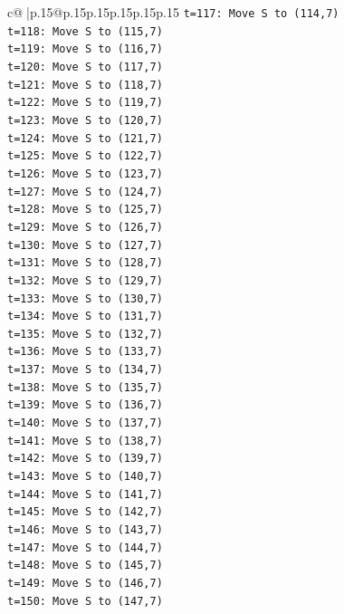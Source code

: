 \documentclass{article}
\begin{document}
{\begin{supertabular}{c@{$\;$}|p{.15\linewidth}@{}p{.15\linewidth}p{.15\linewidth}p{.15\linewidth}p{.15\linewidth}p{.15\linewidth}}
{{{\texttt{t=117: Move S to (114,7)} \\
\texttt{t=118: Move S to (115,7)} \\
\texttt{t=119: Move S to (116,7)} \\
\texttt{t=120: Move S to (117,7)} \\
\texttt{t=121: Move S to (118,7)} \\
\texttt{t=122: Move S to (119,7)} \\
\texttt{t=123: Move S to (120,7)} \\
\texttt{t=124: Move S to (121,7)} \\
\texttt{t=125: Move S to (122,7)} \\
\texttt{t=126: Move S to (123,7)} \\
\texttt{t=127: Move S to (124,7)} \\
\texttt{t=128: Move S to (125,7)} \\
\texttt{t=129: Move S to (126,7)} \\
\texttt{t=130: Move S to (127,7)} \\
\texttt{t=131: Move S to (128,7)} \\
\texttt{t=132: Move S to (129,7)} \\
\texttt{t=133: Move S to (130,7)} \\
\texttt{t=134: Move S to (131,7)} \\
\texttt{t=135: Move S to (132,7)} \\
\texttt{t=136: Move S to (133,7)} \\
\texttt{t=137: Move S to (134,7)} \\
\texttt{t=138: Move S to (135,7)} \\
\texttt{t=139: Move S to (136,7)} \\
\texttt{t=140: Move S to (137,7)} \\
\texttt{t=141: Move S to (138,7)} \\
\texttt{t=142: Move S to (139,7)} \\
\texttt{t=143: Move S to (140,7)} \\
\texttt{t=144: Move S to (141,7)} \\
\texttt{t=145: Move S to (142,7)} \\
\texttt{t=146: Move S to (143,7)} \\
\texttt{t=147: Move S to (144,7)} \\
\texttt{t=148: Move S to (145,7)} \\
\texttt{t=149: Move S to (146,7)} \\
\texttt{t=150: Move S to (147,7)} \\
}}}
\end{supertabular}}
\end{document}

